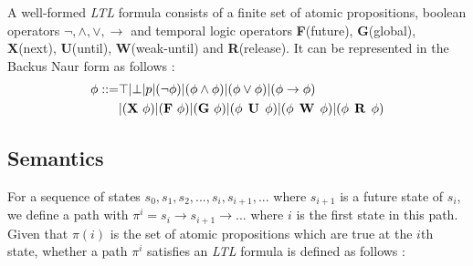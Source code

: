 A well-formed \emph{LTL} formula consists of a finite set of atomic propositions, boolean operators $\neg, \wedge, \vee, \rightarrow$ and temporal logic operators \textbf{F}(future), \textbf{G}(global), \textbf{X}(next), \textbf{U}(until), \textbf{W}(weak-until) and \textbf{R}(release). It can be represented in the Backus Naur form as follows \citep{huth2004}:
\begin{align}
\phi ::= & \top | \bot | p | (\neg\phi) | (\phi \wedge \phi) | (\phi \vee \phi) | (\phi \rightarrow \phi) \nonumber \\
& | (\mathop{\mbox{\textbf{X}}}\, \phi) | (\mathop{\mbox{\textbf{F}}}\, \phi) | (\mathop{\mbox{\textbf{G}}}\, \phi) | (\phi \mathrel{\mbox{\,\textbf{U}}}\, \phi) | (\phi \mathrel{\mbox{\,\textbf{W}}}\, \phi) | (\phi \mathrel{\mbox{\,\textbf{R}}}\, \phi)
\end{align}

\subsection{Semantics}

For a sequence of states $s_0, s_1, s_2, ..., s_i, s_{i + 1}, ...$ where $s_{i + 1}$ is a future state of $s_i$, we define a path with $\pi^i = s_i \rightarrow s_{i + 1} \rightarrow ...$ where $i$ is the first state in this path. Given that $\pi(i)$ is the set of atomic propositions which are true at the $i$th state, whether a path $\pi^i$ satisfies an \emph{LTL} formula is defined as follows \citep{rozier2011linear}:

